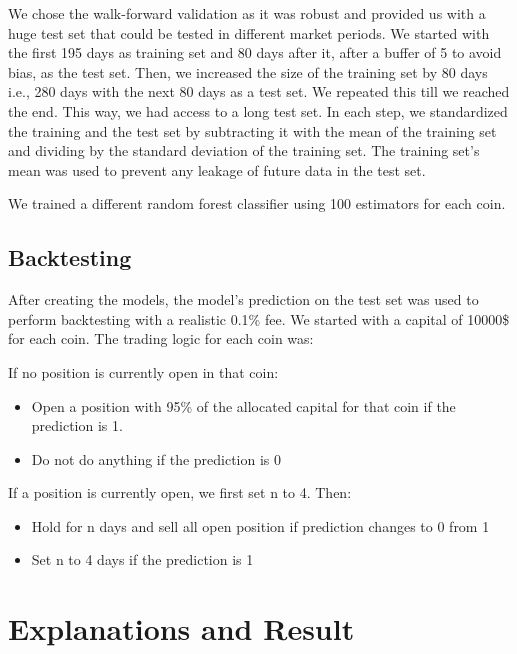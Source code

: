 \documentclass[letterpaper]{article}
\begin{document}
We chose the walk-forward validation as it was robust and provided us with a huge test set that could be 
tested in different market periods. 
We started with the first 195 days as training set and 80 days after it, after a buffer of 5 to avoid bias, as the test
 set. Then, we increased the size 
 of the training set by 80 days i.e., 280 days with the next 80 days as a test set.
 We repeated this till we reached the end. This way, we had 
 access to a long test set.
 In each step, we standardized the training and the test set by subtracting 
 it with the mean of the training set and 
dividing by the standard deviation of the training set. The training set's mean was used to prevent 
any leakage of future data in the test set. \par 

We trained a different random forest classifier using 100 estimators for each coin.

\subsection{Backtesting}
\label{sec:backtest}
After creating the models, the model's prediction on the test set was used to perform backtesting with a realistic
 0.1\% fee. We started with a capital of 10000\$ for each coin. The trading logic for each coin was:
\bigskip\bigskip



\noindent If no position is currently open in that coin:
 \begin{itemize}
 \item Open a position with 95\% of the allocated capital for that coin if the prediction is 1.
 \item Do not do anything if the prediction is 0
 \end{itemize}
 \bigskip

\noindent If a position is currently open, we first set n to 4. Then:
\begin{itemize}
 \item Hold for n days and sell all open position if prediction changes to 0 from 1
 \item Set n to 4 days if the prediction is 1
\end{itemize}

\bigskip

\section{Explanations and Result}
\label{sec:result}
\end{document}

